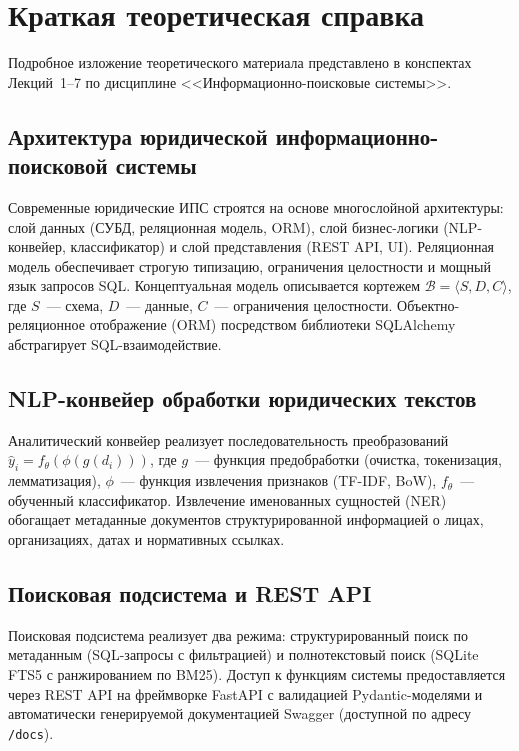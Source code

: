 \documentclass[a4paper,12pt]{article}
\begin{document}
\section{Краткая теоретическая справка}

\begin{infobox}[Источники]
Подробное изложение теоретического материала представлено в конспектах Лекций~1--7 по дисциплине <<Информационно-поисковые системы>>.
\end{infobox}

\subsection{Архитектура юридической информационно-поисковой системы}

Современные юридические ИПС строятся на основе многослойной архитектуры: слой данных (СУБД, реляционная модель, ORM), слой бизнес-логики (NLP-конвейер, классификатор) и слой представления (REST API, UI). Реляционная модель обеспечивает строгую типизацию, ограничения целостности и мощный язык запросов SQL. Концептуальная модель описывается кортежем $\mathcal{B} = \langle S, D, C \rangle$, где $S$~--- схема, $D$~--- данные, $C$~--- ограничения целостности. Объектно-реляционное отображение (ORM) посредством библиотеки SQLAlchemy абстрагирует SQL-взаимодействие.

\subsection{NLP-конвейер обработки юридических текстов}

Аналитический конвейер реализует последовательность преобразований $\hat{y}_i = f_\theta(\phi(g(d_i)))$, где $g$~--- функция предобработки (очистка, токенизация, лемматизация), $\phi$~--- функция извлечения признаков (TF-IDF, BoW), $f_\theta$~--- обученный классификатор. Извлечение именованных сущностей (NER) обогащает метаданные документов структурированной информацией о лицах, организациях, датах и нормативных ссылках.

\subsection{Поисковая подсистема и REST API}

Поисковая подсистема реализует два режима: структурированный поиск по метаданным (SQL-запросы с фильтрацией) и полнотекстовый поиск (SQLite FTS5 с ранжированием по BM25). Доступ к функциям системы предоставляется через REST API на фреймворке FastAPI с валидацией Pydantic-моделями и автоматически генерируемой документацией Swagger (доступной по адресу \texttt{/docs}).
\end{document}
